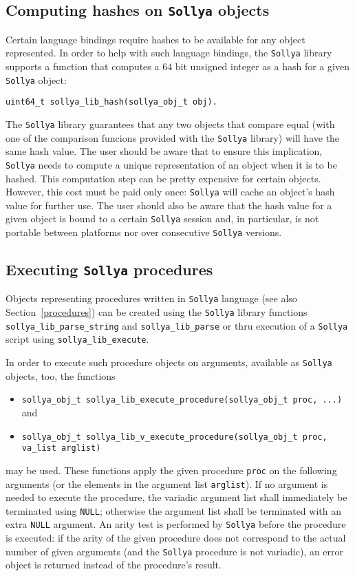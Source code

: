 \documentclass[a4paper]{article}
\newcommand{\sollya}{\texttt{Sollya}\xspace}
\begin{document}
\subsection{Computing hashes on \sollya objects}

Certain language bindings require hashes to be available for any
object represented. In order to help with such language bindings, the
\sollya library supports a function that computes a $64$ bit unsigned
integer as a hash for a given \sollya object: 
\begin{center}
\verb|uint64_t sollya_lib_hash(sollya_obj_t obj).|
\end{center}
The \sollya library guarantees that any two objects that compare equal
(with one of the comparison funcions provided with the \sollya
library) will have the same hash value. The user should be aware that
to ensure this implication, \sollya needs to compute a unique
representation of an object when it is to be hashed. This computation
step can be pretty expensive for certain objects. However, this cost
must be paid only once: \sollya will cache an object's hash value for
further use. The user should also be aware that the hash value for a
given object is bound to a certain \sollya session and, in particular,
is not portable between platforms nor over consecutive \sollya versions.

\subsection{Executing \sollya procedures}

Objects representing procedures written in \sollya language (see also
Section~\ref{procedures}) can be created using the \sollya library
functions \verb|sollya_lib_parse_string| and \verb|sollya_lib_parse|
or thru execution of a \sollya script using \verb|sollya_lib_execute|.

In order to execute such procedure objects on arguments, available as
\sollya objects, too, the functions 
\begin{itemize}
\item \verb|sollya_obj_t sollya_lib_execute_procedure(sollya_obj_t proc, ...)| and 
\item \verb|sollya_obj_t sollya_lib_v_execute_procedure(sollya_obj_t proc, va_list arglist)|
\end{itemize}
may be used. These functions apply the given procedure \verb|proc| on
the following arguments (or the elements in the argument list
\verb|arglist|). If no argument is needed to execute the procedure,
the variadic argument list shall immediately be terminated using
\verb|NULL|; otherwise the argument list shall be terminated with an
extra \verb|NULL| argument. An arity test is performed by \sollya
before the procedure is executed: if the arity of the given procedure
does not correspond to the actual number of given arguments (and the
\sollya procedure is not variadic), an error object is returned
instead of the procedure's result. 
\end{document}

